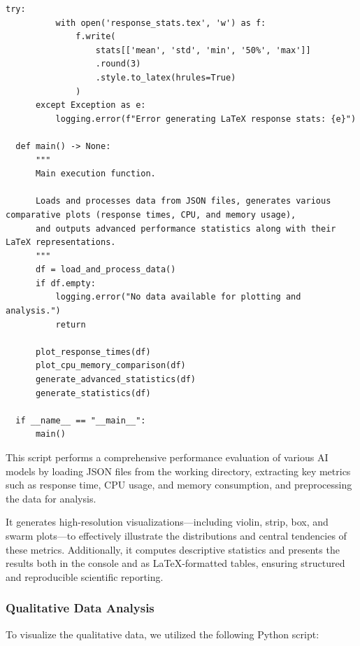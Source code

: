\begin{lstlisting}[style=Python, caption={Python-quantitative-data-analysis}, captionpos=b]
      try:
          with open('response_stats.tex', 'w') as f:
              f.write(
                  stats[['mean', 'std', 'min', '50%', 'max']]
                  .round(3)
                  .style.to_latex(hrules=True)
              )
      except Exception as e:
          logging.error(f"Error generating LaTeX response stats: {e}")
  
  def main() -> None:
      """
      Main execution function.
      
      Loads and processes data from JSON files, generates various comparative plots (response times, CPU, and memory usage),
      and outputs advanced performance statistics along with their LaTeX representations.
      """
      df = load_and_process_data()
      if df.empty:
          logging.error("No data available for plotting and analysis.")
          return
      
      plot_response_times(df)
      plot_cpu_memory_comparison(df)
      generate_advanced_statistics(df)
      generate_statistics(df)
  
  if __name__ == "__main__":
      main()  
\end{lstlisting}
This script performs a comprehensive performance evaluation of various AI models by loading JSON files from the working directory, extracting key metrics such as response time, CPU usage, and memory consumption, and preprocessing the data for analysis. 

It generates high-resolution visualizations—including violin, strip, box, and swarm plots—to effectively illustrate the distributions and central tendencies of these metrics. Additionally, it computes descriptive statistics and presents the results both in the console and as LaTeX-formatted tables, ensuring structured and reproducible scientific reporting.


\subsubsection{Qualitative Data Analysis}

To visualize the qualitative data, we utilized the following Python script:


